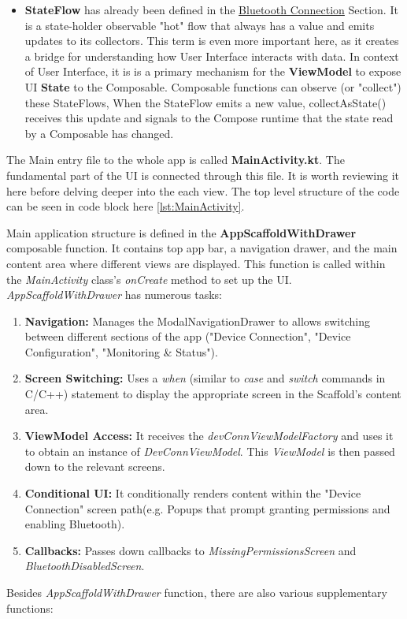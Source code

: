 \begin{itemize}
	\item \textbf{StateFlow} has already been defined in the \hyperref[subsec:Bluetooth]{Bluetooth Connection} Section. It is a state-holder observable "hot" flow that always has a value and emits updates to its collectors. This term is even more important here, as it creates a bridge for understanding how User Interface interacts with data. In context of User Interface, it is is a primary mechanism for the \textbf{ViewModel} to expose \ac{UI} \textbf{State} to the Composable. Composable functions can observe (or "collect") these StateFlows, When the StateFlow emits a new value, collectAsState() receives this update and signals to the Compose runtime that the state read by a Composable has changed.
\end{itemize}
The Main entry file to the whole app is called \textbf{MainActivity.kt}. The fundamental part of the \ac{UI} is connected through this file. It is worth reviewing it here before delving deeper into the each view. The top level structure of the code can be seen in code block here \ref{lst:MainActivity}.

Main application structure is defined in the \textbf{AppScaffoldWithDrawer} composable function. It contains top app bar, a navigation drawer, and the main content area where different views are displayed. This function is called within the \textit{MainActivity} class's \textit{onCreate} method to set up the UI.
\textit{AppScaffoldWithDrawer} has numerous tasks:
\begin{enumerate}
	\item \textbf{Navigation:} Manages the ModalNavigationDrawer to allows switching between different sections of the app ("Device Connection", "Device Configuration", "Monitoring \& Status").
	\item \textbf{Screen Switching:} Uses a \textit{when} (similar to \textit{case} and \textit{switch} commands in C/C++) statement to display the appropriate screen in the Scaffold's content area.
	\item \textbf{ViewModel Access:} It receives the \textit{devConnViewModelFactory} and uses it to obtain an instance of \textit{DevConnViewModel}. This \textit{ViewModel} is then passed down to the relevant screens.
	\item \textbf{Conditional UI:} It conditionally renders content within the "Device Connection" screen path(e.g. Popups that prompt granting permissions and enabling Bluetooth).
	\item \textbf{Callbacks:} Passes down callbacks to \textit{MissingPermissionsScreen} and \textit{BluetoothDisabledScreen}.
\end{enumerate}
Besides \textit{AppScaffoldWithDrawer} function, there are also various supplementary functions:

